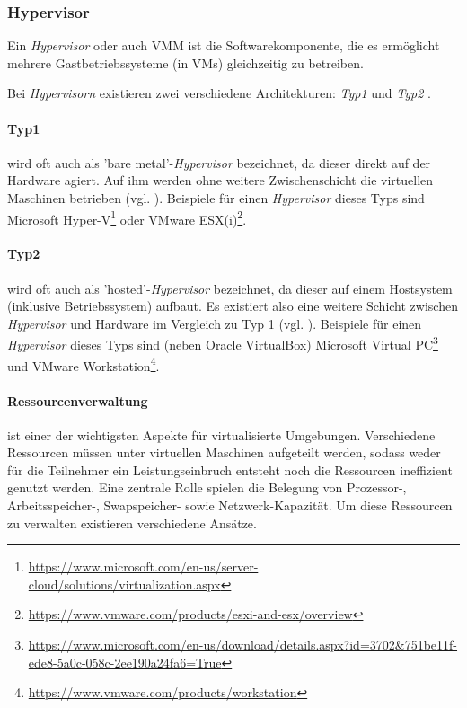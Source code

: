 \subsubsection{Hypervisor}
\label{subsubsec:hypervisor}
Ein \textit{Hypervisor} oder auch \ac{VMM} ist die Softwarekomponente, die es ermöglicht
mehrere Gastbetriebssysteme (in VMs) gleichzeitig zu betreiben.

Bei \textit{Hypervisorn} existieren zwei verschiedene Architekturen: \textit{Typ1} und
\textit{Typ2} \cite{dash13}.

\paragraph{Typ1} wird oft auch als 'bare metal'-\textit{Hypervisor} bezeichnet, da dieser direkt
auf der Hardware agiert. Auf ihm werden ohne weitere Zwischenschicht die virtuellen Maschinen
betrieben (vgl. ).
Beispiele für einen \textit{Hypervisor} dieses Typs sind Microsoft Hyper-V\footnote{\url{https://www.microsoft.com/en-us/server-cloud/solutions/virtualization.aspx}}
oder VMware ESX(i)\footnote{\url{https://www.vmware.com/products/esxi-and-esx/overview}}.

\paragraph{Typ2} wird oft auch als 'hosted'-\textit{Hypervisor} bezeichnet, da dieser auf
einem Hostsystem (inklusive Betriebssystem) aufbaut. Es existiert also eine weitere Schicht
zwischen \textit{Hypervisor} und Hardware im Vergleich zu Typ 1 (vgl. ).
Beispiele für einen \textit{Hypervisor} dieses Typs sind (neben Oracle VirtualBox) Microsoft
Virtual PC\footnote{\url{https://www.microsoft.com/en-us/download/details.aspx?id=3702&751be11f-ede8-5a0c-058c-2ee190a24fa6=True}} und
VMware Workstation\footnote{\url{https://www.vmware.com/products/workstation}}.

\paragraph{Ressourcenverwaltung} ist einer der wichtigsten Aspekte für virtualisierte Umgebungen.
Verschiedene Ressourcen müssen unter virtuellen Maschinen aufgeteilt werden, sodass weder für die
Teilnehmer ein Leistungseinbruch entsteht noch die Ressourcen ineffizient genutzt werden.
Eine zentrale Rolle spielen die Belegung von Prozessor-, Arbeitsspeicher-,
Swapspeicher- sowie Netzwerk-Kapazität. Um diese Ressourcen zu verwalten existieren verschiedene
Ansätze.

